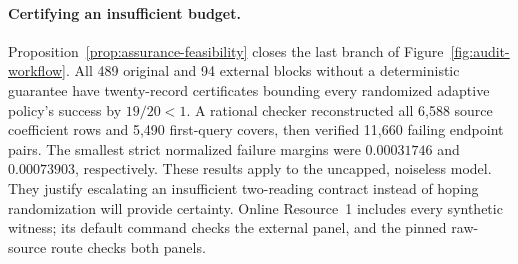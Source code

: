\paragraph{Certifying an insufficient budget.}
Proposition~\ref{prop:assurance-feasibility} closes the last branch of
Figure~\ref{fig:audit-workflow}. All 489 original and 94 external blocks
without a deterministic guarantee have twenty-record certificates bounding
every randomized adaptive policy's success by $19/20<1$. A rational checker
reconstructed all 6,588 source coefficient rows and 5,490 first-query covers,
then verified 11,660 failing endpoint pairs. The smallest strict normalized
failure margins were $0.00031746$ and $0.00073903$, respectively.
These results apply to the uncapped, noiseless model. They justify escalating
an insufficient two-reading contract instead of hoping randomization will
provide certainty. Online Resource~1 includes every synthetic witness; its
default command checks the external panel, and the pinned raw-source route
checks both panels.
